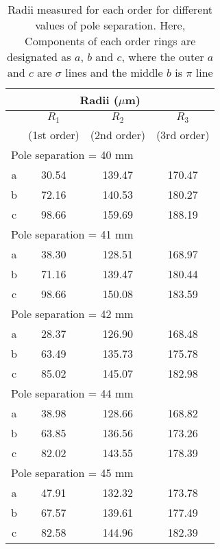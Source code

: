 \begin{table}[H]
    \centering
    \begin{tabular}{cccc}\hline
        \multicolumn{4}{c}{Radii ($\mu$m)}             \\\hline
        & $R_1$& $R_2$ & $R_3$  \\
        & (1st order)&(2nd order) & (3rd order) \\ \hline        
        \multicolumn{4}{l}{Pole separation = 40 mm}             \\\hline
        a &  30.54         &         139.47  &170.47           \\
        b &    72.16       &      140.53     &      180.27     \\
        c &       98.66    &159.69           &         188.19   \\\hline
        \multicolumn{4}{l}{Pole separation = 41 mm}             \\\hline
        a &    38.30       &128.51           &           168.97\\
        b &        71.16   &      139.47     &      180.44     \\
        c &      98.66     &           150.08&183.59            \\\hline
        \multicolumn{4}{l}{Pole separation = 42 mm}             \\ \hline
        a &   28.37        &   126.90        &168.48           \\
        b &    63.49       &    135.73        &     175.78      \\
        c &   85.02        &145.07           &182.98            \\\hline
        \multicolumn{4}{l}{Pole separation = 44 mm}             \\\hline
        a &  38.98         &          128.66 &168.82           \\
        b &      63.85     &      136.56     &      173.26     \\
        c &        82.02   & 143.55          &           178.39 \\\hline
        \multicolumn{4}{l}{Pole separation = 45 mm}             \\\hline
        a &  47.91         &         132.32  &173.78           \\
        b &      67.57     &    139.61       &     177.49      \\
        c &          82.58 &144.96           &          182.39  \\\hline
        \end{tabular}    
        \caption{Radii measured for each order for different values of pole separation. Here, Components of each order rings are designated as $a$, $b$ and $c$, where the outer $a$ and $c$ are $\sigma$ lines and the middle $b$ is $\pi$ line}
        \label{tab:1}
    \end{table}